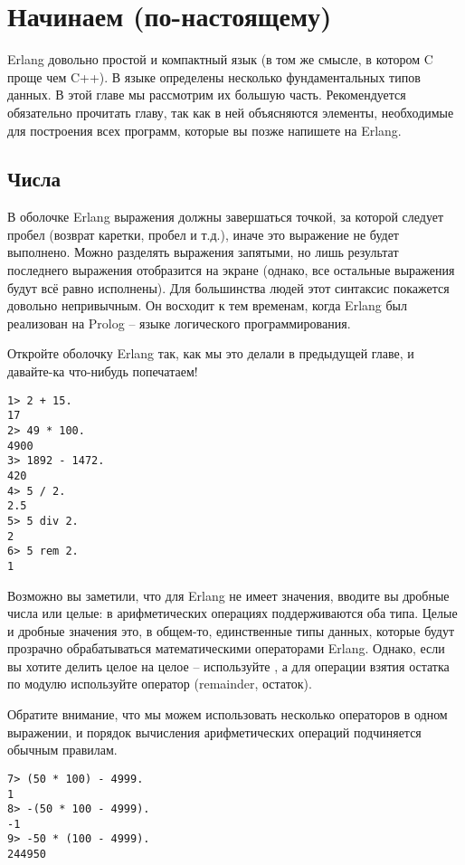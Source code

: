 \chapter{Начинаем (по\--настоящему)}
\label{starting-out-for-real}
\setlength{\parindent}{0cm}
\colorbox{lgray}
{
    \begin{minipage}{\linewidth}
    Erlang довольно простой и компактный язык (в том же смысле, в котором C проще чем C++).
    В языке определены несколько фундаментальных типов данных.
    В этой главе мы рассмотрим их большую часть.
    Рекомендуется обязательно прочитать главу, так как в ней объясняются элементы, необходимые для построения всех программ, которые вы позже напишете на Erlang.
    \end{minipage}
}
\setlength{\parindent}{1cm}
\section{Числа}
В оболочке Erlang выражения должны завершаться точкой, за которой следует пробел (возврат каретки, пробел и т.д.), иначе это выражение не будет выполнено.
Можно разделять выражения запятыми, но лишь результат последнего выражения отобразится на экране (однако, все остальные выражения будут всё равно исполнены).
Для большинства людей этот синтаксис покажется довольно непривычным.
Он восходит к тем временам, когда Erlang был реализован на Prolog \--- языке логического программирования.

Откройте оболочку Erlang так, как мы это делали в предыдущей главе, и давайте\--ка что\--нибудь попечатаем!
\begin{lstlisting}[style=repl]
1> 2 + 15.
17
2> 49 * 100.
4900
3> 1892 - 1472.
420
4> 5 / 2.
2.5
5> 5 div 2.
2
6> 5 rem 2.
1
\end{lstlisting}

Возможно вы заметили, что для Erlang не имеет значения, вводите вы дробные числа или целые: в арифметических операциях поддерживаются оба типа.
Целые и дробные значения это, в общем\--то, единственные типы данных, которые будут прозрачно обрабатываться математическими операторами Erlang.
Однако, если вы хотите делить целое на целое \--- используйте , а для операции взятия остатка по модулю используйте оператор (remainder, остаток).

Обратите внимание, что мы можем использовать несколько операторов в одном выражении, и порядок вычисления арифметических операций подчиняется обычным правилам.
\begin{lstlisting}[style=repl]
7> (50 * 100) - 4999.
1
8> -(50 * 100 - 4999).
-1
9> -50 * (100 - 4999).
244950
\end{lstlisting}

